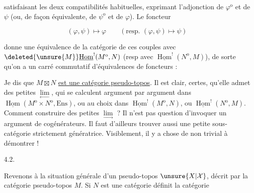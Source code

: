 satisfaisant les deux compatibilités habituelles, exprimant l'adjonction de $\varphi^{\mathrm{o}}$ et de $\psi$ (ou, de façon équivalente, de $\psi^{\mathrm{o}}$ et de $\varphi$). Le foncteur

\[
(\varphi,\psi)\longmapsto\varphi\qquad(\text{resp. }(\varphi,\psi)\longmapsto\psi)
\]

donne une équivalence de la catégorie de ces couples avec $\deleted{\unsure{M}}\underline{\operatorname{Hom}}^{!}(M^{\mathrm{o}},N)$ (resp avec $\underline{\operatorname{Hom}}^{!}(N^{\mathrm{o}},M)$), de sorte qu'on a un carré commutatif d'équivalences  de foncteurs :



Je dis que $M\boxtimes N$ \uline{est une catégorie pseudo-topos}. Il est clair, certes, qu'elle admet des petites $\underset{\longleftarrow}{\lim}$, qui se calculent argument par argument dans $\underline{\operatorname{Hom}}(M^{\mathrm{o}}\times N^{\mathrm{o}},\mathrm{Ens})$, ou au choix dans $\underline{\operatorname{Hom}}^{!}(M^{\mathrm{o}},N)$, ou $\underline{\operatorname{Hom}}^{!}(N^{\mathrm{o}},M)$. Comment construire des petites $\underset{\longrightarrow}{\lim}$ ? Il n'est pas question d'invoquer un argument de cogénérateurs. Il faut d'ailleurs trouver aussi une petite sous-catégorie strictement génératrice. Visiblement, il y a  chose de non trivial à démontrer !

4.2. 

Revenons à la situation générale d'un pseudo-topos $\unsure{X|\mathcal X}$, décrit par la catégorie pseudo-topos $M$. Si $N$ est une catégorie  définit la catégorie

